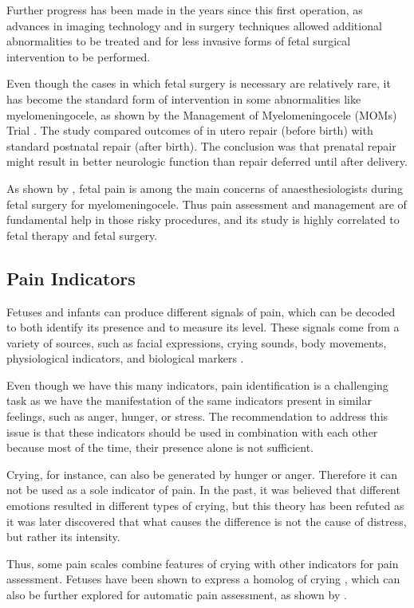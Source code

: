 Further progress has been made in the years since this first operation, as advances in imaging technology and in surgery techniques allowed additional abnormalities to be treated and for less invasive forms of fetal surgical intervention to be performed.

Even though the cases in which fetal surgery is necessary are relatively rare, it has become the standard form of intervention in some abnormalities like myelomeningocele, as shown by the Management of Myelomeningocele (MOMs) Trial \citep{Adzick2011}. The study compared outcomes of in utero repair (before birth) with standard postnatal repair (after birth). The conclusion was that prenatal repair might result in better neurologic function than repair deferred until after delivery.

As shown by \cite{Devoto2017}, fetal pain is among the main concerns of anaesthesiologists during fetal surgery for myelomeningocele. Thus pain assessment and management are of fundamental help in those risky procedures, and its study is highly correlated to fetal therapy and fetal surgery.

\subsection{Pain Indicators}

Fetuses and infants can produce different signals of pain, which can be decoded to both identify its presence and to measure its level. These signals come from a variety of sources, such as facial expressions, crying sounds, body movements, physiological indicators, and biological markers \citep{Bellieni2012}. 

Even though we have this many indicators, pain identification is a challenging task as we have the manifestation of the same indicators present in similar feelings, such as anger, hunger, or stress. The recommendation to address this issue is that these indicators should be used in combination with each other \citep{Bellieni2012} because most of the time, their presence alone is not sufficient. 

Crying, for instance, can also be generated by hunger or anger. Therefore it can not be used as a sole indicator of pain. In the past, it was believed that different emotions resulted in different types of crying, but this theory has been refuted as it was later discovered that what causes the difference is not the cause of distress, but rather its intensity. 

Thus, some pain scales combine features of crying with other indicators for pain assessment. Fetuses have been shown to express a homolog of crying \citep{Gingras2005}, which can also be further explored for automatic pain assessment, as shown by \cite{abs-1909-02543}. 

